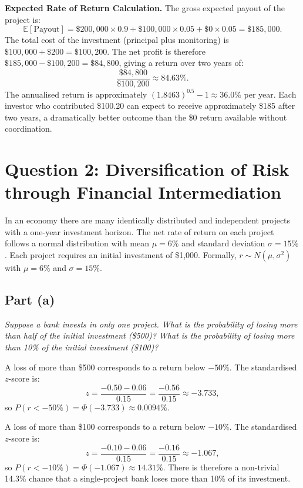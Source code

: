 \documentclass[a4paper]{article}
\begin{document}
\medskip
\textbf{Expected Rate of Return Calculation.}
The gross expected payout of the project is:
\[
\mathbb{E}[\text{Payout}] = \$200{,}000 \times 0.9 + \$100{,}000 \times 0.05
+ \$0 \times 0.05 = \$185{,}000.
\]
The total cost of the investment (principal plus monitoring) is
\(\$100{,}000 + \$200 = \$100{,}200\). The net profit is therefore
\(\$185{,}000 - \$100{,}200 = \$84{,}800\), giving a return over two years of:
\[
\frac{\$84{,}800}{\$100{,}200} \approx 84.63\%.
\]
The annualised return is approximately \((1.8463)^{0.5} - 1 \approx 36.0\%\)
per year. Each investor who contributed \$100.20 can expect to receive
approximately \$185 after two years, a dramatically better outcome than the
\$0 return available without coordination.

\newpage
\section{Question 2: Diversification of Risk through Financial Intermediation}

In an economy there are many identically distributed and independent
projects with a one-year investment horizon. The net rate of return on each
project follows a normal distribution with mean \(\mu = 6\%\) and standard
deviation \(\sigma = 15\%\). Each project requires an initial investment of
\$1,000. Formally, \(r \sim N(\mu, \sigma^{2})\) with \(\mu = 6\%\) and
\(\sigma = 15\%\).

\subsection{Part (a)}

\textit{Suppose a bank invests in only one project. What is the probability
of losing more than half of the initial investment (\$500)? What is the
probability of losing more than 10\% of the initial investment (\$100)?}

\medskip
A loss of more than \$500 corresponds to a return below \(-50\%\). The
standardised $z$-score is:
\[
z = \frac{-0.50 - 0.06}{0.15} = \frac{-0.56}{0.15} \approx -3.733,
\]
so \(P(r < -50\%) = \Phi(-3.733) \approx 0.0094\%\).

A loss of more than \$100 corresponds to a return below \(-10\%\). The
standardised $z$-score is:
\[
z = \frac{-0.10 - 0.06}{0.15} = \frac{-0.16}{0.15} \approx -1.067,
\]
so \(P(r < -10\%) = \Phi(-1.067) \approx 14.31\%\). There is therefore a
non-trivial 14.3\% chance that a single-project bank loses more than 10\%
of its investment.
\end{document}

